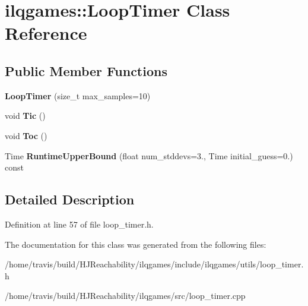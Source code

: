 \hypertarget{classilqgames_1_1_loop_timer}{}\section{ilqgames\+:\+:Loop\+Timer Class Reference}
\label{classilqgames_1_1_loop_timer}
\subsection*{Public Member Functions}
\begin{DoxyCompactItemize}
\item 
{\bfseries Loop\+Timer} (size\+\_\+t max\+\_\+samples=10)\hypertarget{classilqgames_1_1_loop_timer_adf0fca5ddad39e3939fc178b698b3e4d}{}\label{classilqgames_1_1_loop_timer_adf0fca5ddad39e3939fc178b698b3e4d}

\item 
void {\bfseries Tic} ()\hypertarget{classilqgames_1_1_loop_timer_aa4bdb7d7b8550356ffd177890c11c8ef}{}\label{classilqgames_1_1_loop_timer_aa4bdb7d7b8550356ffd177890c11c8ef}

\item 
void {\bfseries Toc} ()\hypertarget{classilqgames_1_1_loop_timer_ac1b528948eebaa660b0cdea9a497002a}{}\label{classilqgames_1_1_loop_timer_ac1b528948eebaa660b0cdea9a497002a}

\item 
Time {\bfseries Runtime\+Upper\+Bound} (float num\+\_\+stddevs=3., Time initial\+\_\+guess=0.) const \hypertarget{classilqgames_1_1_loop_timer_a551691bad650b5c70efbeb08b355638f}{}\label{classilqgames_1_1_loop_timer_a551691bad650b5c70efbeb08b355638f}

\end{DoxyCompactItemize}


\subsection{Detailed Description}


Definition at line 57 of file loop\+\_\+timer.\+h.



The documentation for this class was generated from the following files\+:\begin{DoxyCompactItemize}
\item 
/home/travis/build/\+H\+J\+Reachability/ilqgames/include/ilqgames/utils/loop\+\_\+timer.\+h\item 
/home/travis/build/\+H\+J\+Reachability/ilqgames/src/loop\+\_\+timer.\+cpp\end{DoxyCompactItemize}

